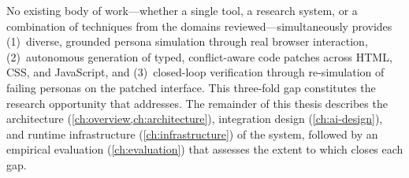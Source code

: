 No existing body of work---whether a single tool, a research system, or a combination of techniques from the domains reviewed---simultaneously provides (1)~diverse, grounded persona simulation through real browser interaction, (2)~autonomous generation of typed, conflict-aware code patches across HTML, CSS, and JavaScript, and (3)~closed-loop verification through re-simulation of failing personas on the patched interface. This three-fold gap constitutes the research opportunity that \versimux{} addresses. The remainder of this thesis describes the architecture (\cref{ch:overview,ch:architecture}),  integration design (\cref{ch:ai-design}), and runtime infrastructure (\cref{ch:infrastructure}) of the system, followed by an empirical evaluation (\cref{ch:evaluation}) that assesses the extent to which \versimux{} closes each gap.

